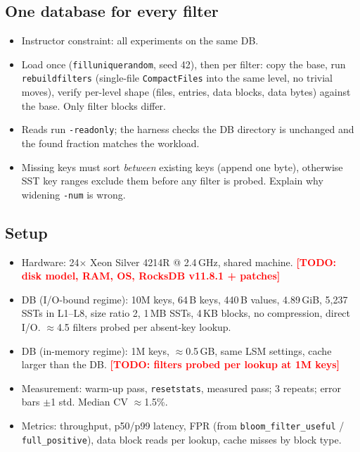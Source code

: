\documentclass[sigconf,nonacm]{acmart}
\newcommand{\todo}[1]{\textcolor{red}{\textbf{[TODO: #1]}}}
\begin{document}
\subsection{One database for every filter}
\begin{itemize}
  \item Instructor constraint: all experiments on the same DB.
  \item Load once (\texttt{filluniquerandom}, seed 42), then per filter: copy
    the base, run \texttt{rebuildfilters} (single-file
    \texttt{CompactFiles} into the same level, no trivial moves), verify
    per-level shape (files, entries, data blocks, data bytes) against the
    base. Only filter blocks differ.
  \item Reads run \texttt{-readonly}; the harness checks the DB directory is
    unchanged and the found fraction matches the workload.
  \item Missing keys must sort \emph{between} existing keys (append one
    byte), otherwise SST key ranges exclude them before any filter is
    probed. Explain why widening \texttt{-num} is wrong.
\end{itemize}

\subsection{Setup}
\begin{itemize}
  \item Hardware: 24$\times$ Xeon Silver 4214R @ 2.4\,GHz, shared machine.
    \todo{disk model, RAM, OS, RocksDB v11.8.1 + patches}
  \item DB (I/O-bound regime): 10M keys, 64\,B keys, 440\,B values,
    4.89\,GiB, 5{,}237 SSTs in L1--L8, size ratio 2, 1\,MB SSTs, 4\,KB
    blocks, no compression, direct I/O. $\approx$4.5 filters probed per
    absent-key lookup.
  \item DB (in-memory regime): 1M keys, $\approx$0.5\,GB, same LSM settings,
    cache larger than the DB. \todo{filters probed per lookup at 1M keys}
  \item Measurement: warm-up pass, \texttt{resetstats}, measured pass;
    3 repeats; error bars $\pm$1 std. Median CV $\approx$1.5\%.
  \item Metrics: throughput, p50/p99 latency, FPR (from
    \texttt{bloom\_filter\_useful} / \texttt{full\_positive}), data block
    reads per lookup, cache misses by block type.
\end{itemize}

\end{document}
